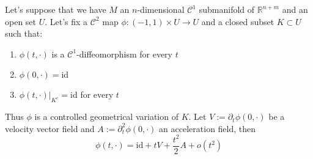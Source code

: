Let's suppose that we have $M$ an $n$-dimensional $\mathcal C^1$ submanifold of
$\mathbb R^{n+m}$ and an open set $U$. Let's fix a $\mathcal C^2$ map $\phi:(-1,1)
\times U\rightarrow U$ and a closed subset $K\subset U$ such that:
\begin{enumerate}
    \item $\phi(t,\cdot)$ is a $\mathcal C^1$-diffeomorphism for every $t$
    \item $\phi(0,\cdot)=\text{id}$
    \item $\phi(t,\cdot)|_{K^c}=\text{id}$ for every $t$
\end{enumerate}
Thus $\phi$ is a controlled geometrical variation of $K$. Let $V:=\partial_t\phi
(0,\cdot)$ be a velocity vector field and $A:=\partial_t^2\phi(0,\cdot)$ an
acceleration field, then
\[\phi(t,\cdot)=\text{id}+tV+\frac{t^2}{2}A+o(t^2)\]

